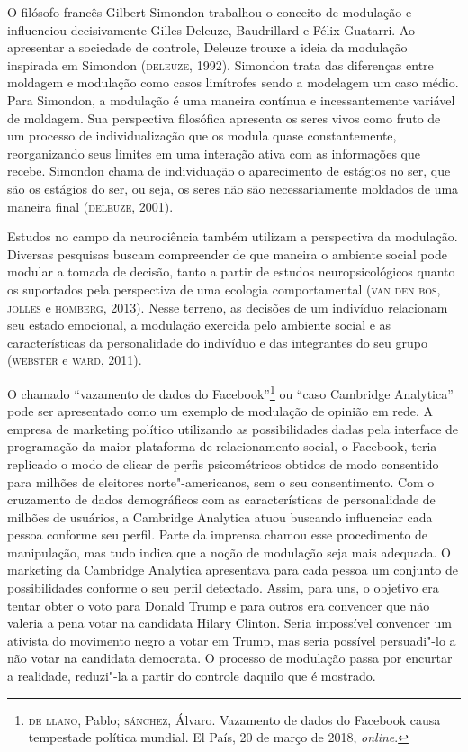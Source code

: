 O filósofo francês Gilbert Simondon trabalhou o conceito de modulação e
influenciou decisivamente Gilles Deleuze, Baudrillard e Félix Guatarri.
Ao apresentar a sociedade de controle, Deleuze trouxe a ideia da
modulação inspirada em Simondon (\textsc{deleuze}, 1992). Simondon trata das
diferenças entre moldagem e modulação como casos limítrofes sendo a
modelagem um caso médio. Para Simondon, a modulação é uma maneira
contínua e incessantemente variável de moldagem. Sua perspectiva
filosófica apresenta os seres vivos como fruto de um processo de
individualização que os modula quase constantemente, reorganizando seus
limites em uma interação ativa com as informações que recebe. Simondon
chama de individuação o aparecimento de estágios no ser, que são os
estágios do ser, ou seja, os seres não são necessariamente moldados de
uma maneira final (\textsc{deleuze}, 2001).

Estudos no campo da neurociência também utilizam a perspectiva da
modulação. Diversas pesquisas buscam compreender de que maneira o
ambiente social pode modular a tomada de decisão, tanto a partir de
estudos neuropsicológicos quanto os suportados pela perspectiva de uma
ecologia comportamental (\textsc{van den bos}, \textsc{jolles} e \textsc{homberg}, 2013). Nesse
terreno, as decisões de um indivíduo relacionam seu estado emocional, a
modulação exercida pelo ambiente social e as características da
personalidade do indivíduo e das integrantes do seu grupo (\textsc{webster} e
\textsc{ward}, 2011).

O chamado ``vazamento de dados do Facebook''\footnote{\textsc{de llano}, Pablo;
  \textsc{sánchez}, Álvaro. Vazamento de dados do Facebook causa tempestade
  política mundial. El País, 20 de março de 2018, \textit{online}.}
ou ``caso Cambridge Analytica'' pode ser apresentado como um exemplo de
modulação de opinião em rede. A empresa de marketing político utilizando
as possibilidades dadas pela interface de programação da maior
plataforma de relacionamento social, o Facebook, teria replicado o modo
de clicar de perfis psicométricos obtidos de modo consentido para
milhões de eleitores norte"-americanos, sem o seu consentimento. Com o
cruzamento de dados demográficos com as características de personalidade
de milhões de usuários, a Cambridge Analytica atuou buscando influenciar
cada pessoa conforme seu perfil. Parte da imprensa chamou esse
procedimento de manipulação, mas tudo indica que a noção de modulação
seja mais adequada. O marketing da Cambridge Analytica apresentava para
cada pessoa um conjunto de possibilidades conforme o seu perfil
detectado. Assim, para uns, o objetivo era tentar obter o voto para
Donald Trump e para outros era convencer que não valeria a pena votar na
candidata Hilary Clinton. Seria impossível convencer um ativista do
movimento negro a votar em Trump, mas seria possível persuadi"-lo a não
votar na candidata democrata. O processo de modulação passa por encurtar
a realidade, reduzi"-la a partir do controle daquilo que é mostrado.

